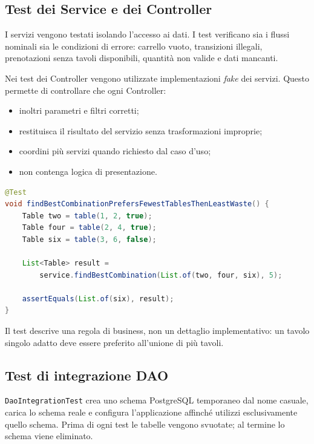 \documentclass[12pt,a4paper]{article}
\newcommand{\code}[1]{\nolinkurl{#1}}
\begin{document}
\subsection{Test dei Service e dei Controller}

I servizi vengono testati isolando l'accesso ai dati. I test verificano sia i
flussi nominali sia le condizioni di errore: carrello vuoto, transizioni illegali,
prenotazioni senza tavoli disponibili, quantità non valide e dati mancanti.

Nei test dei Controller vengono utilizzate implementazioni \emph{fake} dei
servizi. Questo permette di controllare che ogni Controller:

\begin{itemize}[leftmargin=*]
  \item inoltri parametri e filtri corretti;
  \item restituisca il risultato del servizio senza trasformazioni improprie;
  \item coordini più servizi quando richiesto dal caso d'uso;
  \item non contenga logica di presentazione.
\end{itemize}

\begin{lstlisting}[style=codeStyle,language=Java,
caption={Test della politica di allocazione dei tavoli.}]
@Test
void findBestCombinationPrefersFewestTablesThenLeastWaste() {
    Table two = table(1, 2, true);
    Table four = table(2, 4, true);
    Table six = table(3, 6, false);

    List<Table> result =
        service.findBestCombination(List.of(two, four, six), 5);

    assertEquals(List.of(six), result);
}
\end{lstlisting}

Il test descrive una regola di business, non un dettaglio implementativo: un
tavolo singolo adatto deve essere preferito all'unione di più tavoli.

\subsection{Test di integrazione DAO}

\code{DaoIntegrationTest} crea uno schema PostgreSQL temporaneo dal nome casuale,
carica lo schema reale e configura l'applicazione affinché utilizzi esclusivamente
quello schema. Prima di ogni test le tabelle vengono svuotate; al termine lo
schema viene eliminato.
\end{document}
